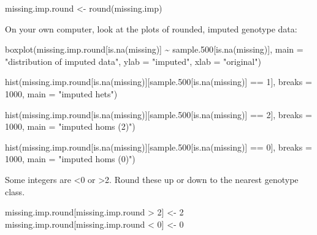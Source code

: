 \documentclass[
]{book}
\newenvironment{Shaded}{\begin{snugshade}}{\end{snugshade}}
\newcommand{\AttributeTok}[1]{\textcolor[rgb]{0.77,0.63,0.00}{#1}}
\newcommand{\DecValTok}[1]{\textcolor[rgb]{0.00,0.00,0.81}{#1}}
\newcommand{\FloatTok}[1]{\textcolor[rgb]{0.00,0.00,0.81}{#1}}
\newcommand{\FunctionTok}[1]{\textcolor[rgb]{0.00,0.00,0.00}{#1}}
\newcommand{\NormalTok}[1]{#1}
\newcommand{\OtherTok}[1]{\textcolor[rgb]{0.56,0.35,0.01}{#1}}
\newcommand{\SpecialCharTok}[1]{\textcolor[rgb]{0.00,0.00,0.00}{#1}}
\newcommand{\StringTok}[1]{\textcolor[rgb]{0.31,0.60,0.02}{#1}}
\begin{document}
\begin{Shaded}
\begin{Highlighting}[]
\NormalTok{missing.imp.round }\OtherTok{\textless{}{-}} \FunctionTok{round}\NormalTok{(missing.imp)}
\end{Highlighting}
\end{Shaded}

On your own computer, look at the plots of rounded, imputed genotype data:

\begin{Shaded}
\begin{Highlighting}[]
\FunctionTok{boxplot}\NormalTok{(missing.imp.round[}\FunctionTok{is.na}\NormalTok{(missing)] }\SpecialCharTok{\textasciitilde{}}\NormalTok{ sample}\FloatTok{.500}\NormalTok{[}\FunctionTok{is.na}\NormalTok{(missing)], }
    \AttributeTok{main =} \StringTok{"distribution of imputed data"}\NormalTok{, }\AttributeTok{ylab =} \StringTok{"imputed"}\NormalTok{, }
    \AttributeTok{xlab =} \StringTok{"original"}\NormalTok{)}

\FunctionTok{hist}\NormalTok{(missing.imp.round[}\FunctionTok{is.na}\NormalTok{(missing)][sample}\FloatTok{.500}\NormalTok{[}\FunctionTok{is.na}\NormalTok{(missing)] }\SpecialCharTok{==} 
    \DecValTok{1}\NormalTok{], }\AttributeTok{breaks =} \DecValTok{1000}\NormalTok{, }\AttributeTok{main =} \StringTok{"imputed hets"}\NormalTok{)}

\FunctionTok{hist}\NormalTok{(missing.imp.round[}\FunctionTok{is.na}\NormalTok{(missing)][sample}\FloatTok{.500}\NormalTok{[}\FunctionTok{is.na}\NormalTok{(missing)] }\SpecialCharTok{==} 
    \DecValTok{2}\NormalTok{], }\AttributeTok{breaks =} \DecValTok{1000}\NormalTok{, }\AttributeTok{main =} \StringTok{"imputed homs (2)"}\NormalTok{)}

\FunctionTok{hist}\NormalTok{(missing.imp.round[}\FunctionTok{is.na}\NormalTok{(missing)][sample}\FloatTok{.500}\NormalTok{[}\FunctionTok{is.na}\NormalTok{(missing)] }\SpecialCharTok{==} 
    \DecValTok{0}\NormalTok{], }\AttributeTok{breaks =} \DecValTok{1000}\NormalTok{, }\AttributeTok{main =} \StringTok{"imputed homs (0)"}\NormalTok{)}
\end{Highlighting}
\end{Shaded}

Some integers are \textless0 or \textgreater2. Round these up or down to the nearest genotype class.

\begin{Shaded}
\begin{Highlighting}[]
\NormalTok{missing.imp.round[missing.imp.round }\SpecialCharTok{\textgreater{}} \DecValTok{2}\NormalTok{] }\OtherTok{\textless{}{-}} \DecValTok{2}
\NormalTok{missing.imp.round[missing.imp.round }\SpecialCharTok{\textless{}} \DecValTok{0}\NormalTok{] }\OtherTok{\textless{}{-}} \DecValTok{0}
\end{Highlighting}
\end{Shaded}
\end{document}
